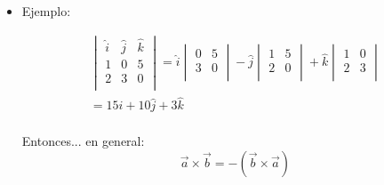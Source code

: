 \begin{itemize}
    \item Ejemplo:
          \begin{center}
            \begin{align*}
                \begin{vmatrix}
                    \hat{i} & \hat{j} & \hat{k} \\ 
                    1 & 0 & 5 \\ 
                    2 & 3 & 0 \\ 
                \end{vmatrix} = \hat{i}\begin{vmatrix}
                    0 & 5 \\ 
                    3 & 0 \\ 
                \end{vmatrix} - \hat{j}\begin{vmatrix}
                    1 & 5 \\ 
                    2 & 0 \\ 
                \end{vmatrix} + \hat{k}\begin{vmatrix}
                    1 & 0 \\ 
                    2 & 3 \\ 
                \end{vmatrix} \\ 
                = 15\hat{i}+10\hat{j}+3\hat{k}\\ 
              \end{align*}
          \end{center}
          Entonces... en general: 
          \[
                \vec{a}\times \vec{b} = -(\vec{b}\times \vec{a})
          \]
\end{itemize}




















